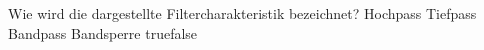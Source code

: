     {Wie wird die dargestellte Filtercharakteristik bezeichnet?}
    {Hochpass}
    {Tiefpass}
    {Bandpass}
    {Bandsperre}
    {true}{false}